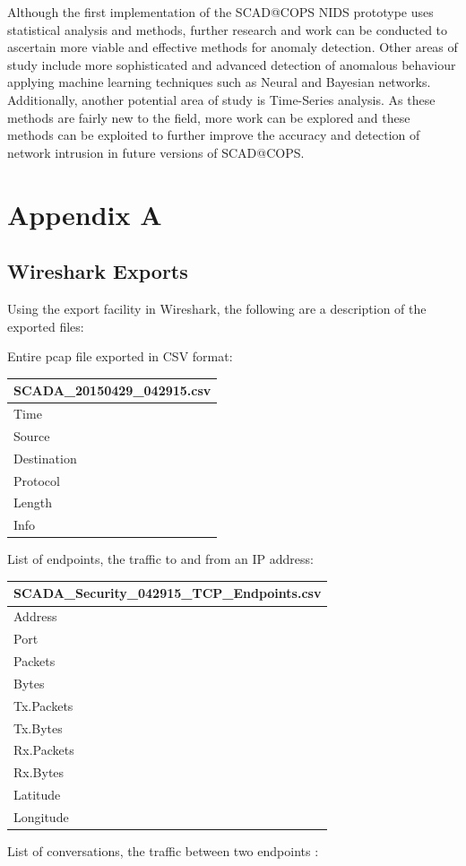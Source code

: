 \documentclass[11pt,]{article}
\begin{document}
Although the first implementation of the SCAD@COPS NIDS prototype uses
statistical analysis and methods, further research and work can be
conducted to ascertain more viable and effective methods for anomaly
detection. Other areas of study include more sophisticated and advanced
detection of anomalous behaviour applying machine learning techniques
such as Neural and Bayesian networks. Additionally, another potential
area of study is Time-Series analysis. As these methods are fairly new
to the field, more work can be explored and these methods can be
exploited to further improve the accuracy and detection of network
intrusion in future versions of SCAD@COPS.

\newpage

\section*{Appendix A}\label{appendix-a}

\subsection*{Wireshark Exports}\label{wireshark-exports}

Using the export facility in Wireshark, the following are a description
of the exported files:

Entire pcap file exported in CSV format:

\begin{longtable}[c]{@{}l@{}}
\toprule
SCADA\_20150429\_042915.csv\tabularnewline
\midrule
\endhead
Time\tabularnewline
Source\tabularnewline
Destination\tabularnewline
Protocol\tabularnewline
Length\tabularnewline
Info\tabularnewline
\bottomrule
\end{longtable}

List of endpoints, the traffic to and from an IP address:

\begin{longtable}[c]{@{}l@{}}
\toprule
SCADA\_Security\_042915\_TCP\_Endpoints.csv\tabularnewline
\midrule
\endhead
Address\tabularnewline
Port\tabularnewline
Packets\tabularnewline
Bytes\tabularnewline
Tx.Packets\tabularnewline
Tx.Bytes\tabularnewline
Rx.Packets\tabularnewline
Rx.Bytes\tabularnewline
Latitude\tabularnewline
Longitude\tabularnewline
\bottomrule
\end{longtable}

List of conversations, the traffic between two endpoints :
\end{document}
